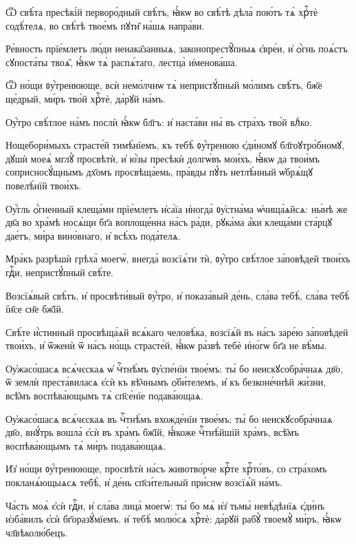 \hKv Ѿ свѣ́та пресѣкі́й перворо́дный  свѣ́тъ, ꙗ҆́кѡ во свѣ́тѣ дѣла̀ пою́тъ тѧ̀ хрⷭ҇тѐ  содѣ́телѧ, во свѣ́тѣ твое́мъ пꙋти̑ на́шѧ напра́ви. 

\hKv Ре́вность прїе́млетъ лю́ди ненака̑занныѧ,  законопрестꙋ̑пныѧ є҆вре́и, и҆ ѻ҆́гнь поѧ́стъ  сꙋпоста́ты твоѧ̑, ꙗ҆́кѡ тѧ̀ распѧ́таго, лестца̀  и҆менова́ша. 

\hKv Ѿ но́щи ᲂу҆́тренююще, всѝ немо́лчнѡ тѧ̀ непристꙋ́пный  мо́лимъ свѣ́тъ, бж҃е ще́дрый, ми́ръ тво́й хрⷭ҇тѐ, да́рꙋй  на́мъ. 

\hKv Оу҆́тро свѣ́тлое на́мъ послѝ ꙗ҆́кѡ бл҃гъ: и҆ наста́ви  ны̀ въ стра́хъ тво́й влⷣко. 

\hKv Нощебори́мыхъ страсте́й тимѣ́нїемъ, къ тебѣ̀ ᲂу҆́тренюю  є҆ди́номꙋ бл҃гоꙋтро́бномꙋ, дꙋшѝ моеѧ̀ мглꙋ̀ просвѣтѝ, и҆  ю҆́зы пресѣкѝ долгѡ́въ мои́хъ, ꙗ҆́кѡ да твои́мъ  соприсносꙋ́щнымъ дх҃омъ просвѣща́емь, пра́вды пꙋ́ть  нетлѣ́нный ѡ҆брѧ́щꙋ повелѣ́нїй твои́хъ. 

\hKv Оу҆́гль ѻ҆́гненный клеща́ми прїе́млетъ и҆са́їа и҆ногда̀  ᲂу҆стна́ма ѡ҆чища́ѧйсѧ: ны́нѣ же дв҃а во хра́мѣ носѧ́щи  бг҃а воплоще́нна на́съ ра́ди, рꙋка́ма а҆́ки клеща́ми ста́рцꙋ  дае́тъ, ми́ра вино́внаго, и҆ всѣ́хъ пода́телѧ.  

\hKv Мра́къ разрѣшѝ грѣха̀ моегѡ̀, внегда̀ возсїѧ́ти тѝ,  ᲂу҆́тро свѣ́тлое за́повѣдей твои́хъ гдⷭ҇и, непристꙋ́пный  свѣ́те. 

\hKv Возсїѧ́вый свѣ́тъ, и҆ просвѣти́вый ᲂу҆́тро, и҆ показа́вый  де́нь, сла́ва тебѣ̀, сла́ва тебѣ̀ і҆и҃се сн҃е бж҃їй. 

\hKv Свѣ́те и҆́стинный просвѣща́ѧй всѧ́каго человѣ́ка,  возсїѧ́й въ на́съ заре́ю за́повѣдей твои́хъ, и҆ ѿженѝ  ѿ на́съ но́щь страсте́й, ꙗ҆́кѡ ра́звѣ тебѐ и҆но́гѡ бг҃а  не вѣ́мы. 
%

\hKv Оу҆жасо́шасѧ всѧ́чєскаѧ ѡ҆ чⷭ҇тнѣ́мъ  ᲂу҆спе́нїи твое́мъ: ты́ бо неискꙋсобра́чнаѧ дв҃о, ѿ  землѝ преста́виласѧ є҆сѝ къ вѣ̑чнымъ ѻ҆би́телемъ, и҆ къ  безконе́чнѣй жи́зни, всѣ̑мъ воспѣва́ющымъ тѧ̀ сп҃се́нїе  подава́ющаѧ. 
%

\hKv Оу҆жасо́шасѧ всѧ́чєскаѧ въ чⷭ҇тнѣ́мъ  вхожде́нїи твое́мъ: ты́ бо неискꙋсобра́чнаѧ дв҃о, внꙋ́трь  вошла̀ є҆сѝ въ хра́мъ бж҃їй, ꙗ҆́коже чⷭ҇тнѣ́йшїй хра́мъ,  всѣ̑мъ воспѣва́ющымъ тѧ̀ ми́ръ подава́ющаѧ.  

\hKv И҆з̾ но́щи ᲂу҆́тренююще, просвѣтѝ на́съ животво́рче  крⷭ҇те хрⷭ҇то́въ, со стра́хомъ покланѧ́ющыѧсѧ тебѣ̀, и҆  де́нь сп҃си́тельный при́снѡ возсїѧ́й на́мъ. 

\hKv Ча́сть моѧ̀ є҆сѝ гдⷭ҇и, и҆ сла́ва лица̀ моегѡ̀: ты́ бо мѧ̀  и҆з̾ тьмы̀ невѣ́дѣнїѧ є҆ди́нъ и҆зба́вилъ є҆сѝ  бг҃оразꙋ́мїемъ. и҆ тебѣ̀ молю́сѧ хрⷭ҇тѐ: да́рꙋй рабꙋ̀  твоемꙋ̀ ми́ръ, ꙗ҆́кѡ чл҃вѣколю́бецъ. 
%

